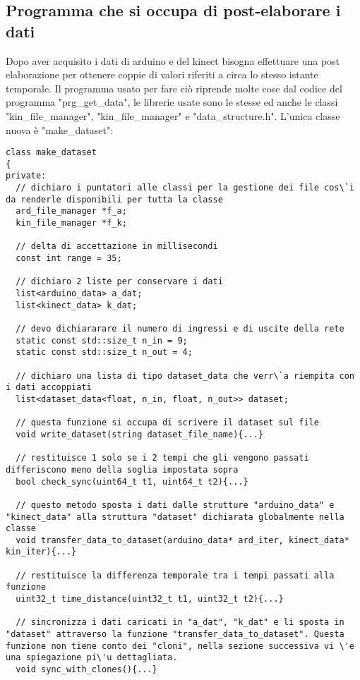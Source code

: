 \documentclass[10pt,a4paper]{article}
\begin{document}
\subsection{Programma che si occupa di post-elaborare i dati}
Dopo aver acquisito i dati di arduino e del kinect bisogna effettuare una post elaborazione per ottenere coppie di valori riferiti a circa lo stesso istante temporale. 
Il programma usato per fare ci\`o riprende molte cose dal codice del programma "prg\_get\_data", le librerie usate sono le stesse ed anche le classi "kin\_file\_manager", "kin\_file\_manager" e "data\_structure.h".
L'unica classe nuova \`e "make\_dataset":
\begin{lstlisting}[style=mycpp, caption=classe make\_dataset, captionpos=b]
class make_dataset
{
private:
  // dichiaro i puntatori alle classi per la gestione dei file cos\`i da renderle disponibili per tutta la classe
  ard_file_manager *f_a;
  kin_file_manager *f_k;

  // delta di accettazione in millisecondi
  const int range = 35; 

  // dichiaro 2 liste per conservare i dati 
  list<arduino_data> a_dat;
  list<kinect_data> k_dat;

  // devo dichiararare il numero di ingressi e di uscite della rete
  static const std::size_t n_in = 9;
  static const std::size_t n_out = 4;

  // dichiaro una lista di tipo dataset_data che verr\`a riempita con i dati accoppiati
  list<dataset_data<float, n_in, float, n_out>> dataset;

  // questa funzione si occupa di scrivere il dataset sul file
  void write_dataset(string dataset_file_name){...}

  // restituisce 1 solo se i 2 tempi che gli vengono passati differiscono meno della soglia impostata sopra
  bool check_sync(uint64_t t1, uint64_t t2){...}

  // questo metodo sposta i dati dalle strutture "arduino_data" e "kinect_data" alla struttura "dataset" dichiarata globalmente nella classe
  void transfer_data_to_dataset(arduino_data* ard_iter, kinect_data* kin_iter){...}

  // restituisce la differenza temporale tra i tempi passati alla funzione
  uint32_t time_distance(uint32_t t1, uint32_t t2){...}

  // sincronizza i dati caricati in "a_dat", "k_dat" e li sposta in "dataset" attraverso la funzione "transfer_data_to_dataset". Questa funzione non tiene conto dei "cloni", nella sezione successiva vi \'e una spiegazione pi\'u dettagliata. 
  void sync_with_clones(){...}


\end{lstlisting}
\end{document}
